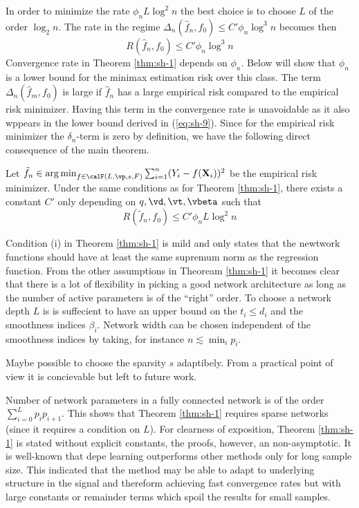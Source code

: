 In order to minimize the rate $\phi_n L \log^2 n$ the best choice is to choose $L$ of the order $\log_2 n$. The rate in the regime $\Delta_n (\hat{f}_n, f_0)\leq C'\phi_n\log^3n$ becomes then 
\[R(\hat{f}_n,f_0)\leq C'\phi_n \log^3 n\]
Convergence rate in Theorem \ref{thm:sh-1} depends on $\phi_n$. Below will show that $\phi_n$ is a lower bound for the minimax estimation risk over this class. The term $\Delta_n(\hat{f}_m,f_0)$ is large if $\hat{f}_n$ has a large empirical risk compared to the empirical risk minimizer. Having this term in the convergence rate is unavoidable as it also wppears in the lower bound derived in (\ref{eq:sh-9}). Since for the empirical risk minimizer the $\delta_n$-term is zero by definition, we have the following direct consequence of the main theorem. 
\begin{corollary}
	\label{cor:sh-1}
	Let $\tilde{f}_n \in \argmin_{f\in\calF(L,\vp,s,F)} \sum_{i=1}^n(Y_i - f(\vX_i))^2$ be the empirical risk minimizer. Under the same conditions as for Theorem \ref{thm:sh-1}, there exists a constant $C'$ only depending on $q,\vd,\vt,\vbeta$ such that 
	\begin{equation}
		\label{eq:sh-10}
		R(\tilde{f}_n,f_0) \leq C'\phi_n L \log^2 n
	\end{equation}
\end{corollary}
Condition (i) in Theorem \ref{thm:sh-1} is mild and only states that the newtwork functions should have at least the same supremum norm as the regression function. From the other assumptions in Theoream \ref{thm:sh-1} it becomes clear that there is a lot of flexibility in picking a good network architecture as long as the number of active parameters is of the ``right'' order. To choose a network depth $L$ is is suffecient to have an upper bound on the $t_i \leq d_i$ and the smoothness indices $\beta_i$. Network width can be chosen independent of the smoothness indices by taking, for instance $n\lesssim \min_i p_i$.

Maybe possible to choose the sparsity $s$ adaptibely. From a practical point of view it is concievable but left to future work. 

Number of network parameters in a fully connected network is of the order $\sum_{i=0}^L p_i p_{i+1}$. This shows that Theorem \ref{thm:sh-1} requires sparse networks (since it requires a condition on $L$). For clearness of exposition, Theorem \ref{thm:sh-1} is stated without explicit constants, the proofs, however, an non-asymptotic. It is well-known that depe learning outperforms other methods only for long sample size. This indicated that the method may be able to adapt to underlying structure in the signal and thereform achieving fast convergence rates but with large constants or remainder terms which spoil the results for small samples. 

